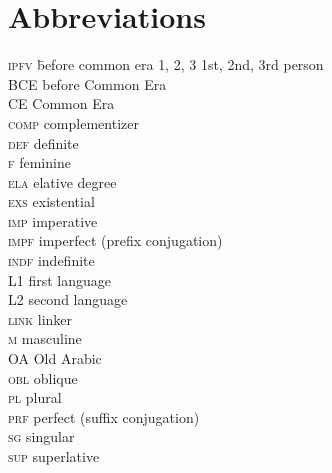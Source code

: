 \documentclass[output=paper]{langsci/langscibook}
\begin{document}
\section*{Abbreviations}
\setlength{\columnsep}{30pt}
\begin{multicols}{2}
\begin{tabbing}
\textsc{ipfv} \hspace{1em} \= before common era\kill
\textsc{1, 2, 3} \> 1st, 2nd, 3rd person \\
BCE \> before Common Era \\
CE \> Common Era \\
\textsc{comp} \> {complementizer} \\
\textsc{def} \> {definite} \\
\textsc{f} \> feminine \\
\textsc{ela} \> {elative} degree \\
\textsc{exs} \> {existential} \\
\textsc{imp} \> imperative \\
\textsc{impf} \> imperfect (prefix conjugation) \\
\textsc{indf} \> indefinite \\
L1 \> first language \\
L2 \> second language \\
\textsc{link} \> linker \\
\textsc{m} \> masculine \\
OA \> Old Arabic \\
\textsc{obl} \> oblique \\
\textsc{pl} \> plural \\
\textsc{prf} \> perfect (suffix conjugation) \\
\textsc{sg} \> singular \\
\textsc{sup} \> {superlative}
\end{tabbing}
\end{multicols}


\sloppy
\printbibliography[heading=subbibliography,notkeyword=this] 
\end{document}
